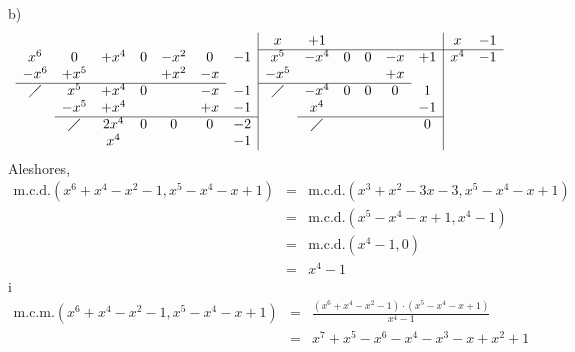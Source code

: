 \begin{solucio}
b)
\[
\begin{array}{ccccccc|cccccc|cc}
& & & & & & & x & +1 & & & & & x & -1 \\ \cline{8-15}
x^{6} & 0 & +x^{4} & 0 & -x^{2} & 0 & -1 & x^{5} & -x^{4} & 0 & 0 & -x & +1
& x^{4} & -1 \\
-x^{6} & +x^{5} & & & +x^{2} & -x & & -x^{5} & & & & +x & & & \\
\cline{1-6}\cline{8-12}
\diagup & x^{5} & +x^{4} & 0 & & -x & -1 & \diagup & -x^{4} & 0 & 0 & 0 & 1
& & \\
& -x^{5} & +x^{4} & & & +x & -1 & & x^{4} & & & & -1 & & \\
\cline{2-7}\cline{9-13}
& \diagup & 2x^{4} & 0 & 0 & 0 & -2 & & \diagup & & & & 0 & & \\
& & x^{4} & & & & -1 & & & & & & & &
\end{array}\]Aleshores,\begin{eqnarray*}
\text{m.c.d.}\left( x^{6}+x^{4}-x^{2}-1,x^{5}-x^{4}-x+1\right) &=&\text{m.c.d.}\left( x^{3}+x^{2}-3x-3,x^{5}-x^{4}-x+1\right) \\
&=&\text{m.c.d.}\left( x^{5}-x^{4}-x+1,x^{4}-1\right) \\
&=&\text{m.c.d.}\left( x^{4}-1,0\right) \\
&=&x^{4}-1
\end{eqnarray*}i\begin{eqnarray*}
\text{m.c.m.}\left( x^{6}+x^{4}-x^{2}-1,x^{5}-x^{4}-x+1\right) &=&\frac{\left( x^{6}+x^{4}-x^{2}-1\right) \cdot \left( x^{5}-x^{4}-x+1\right) }{x^{4}-1} \\
&=&x^{7}+x^{5}-x^{6}-x^{4}-x^{3}-x+x^{2}+1
\end{eqnarray*}


\end{solucio}
